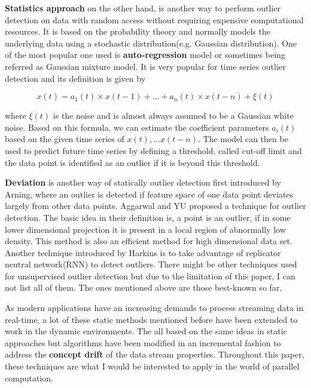 \documentclass[11pt]{article}       %
\begin{document}
\textbf{Statistics approach} on the other hand, is another way to perform outlier detection on data with random access without requiring expensive computational resources. It is based on the probability theory and normally models the underlying data using a stochastic distribution(e.g. Gaussian distribution). One of the most popular one used is \textbf{auto-regression} model or sometimes being referred as Gaussian mixture model\cite{4438332}. It is very popular for time series outlier detection and its definition is given by 

\[ x(t) = a_{1}(t) \times x(t-1) + ... + a_{n}(t) \times x(t -n) + \xi(t) \]

where $\xi(t)$ is the noise and is almost always assumed to be a Gaussian white noise. Based on this formula, we can estimate the coefficient parameters $a_{i}(t)$ based on the given time series of $x(t),...x(t-n)$. The model can then be used to predict future time series by defining a threshold, called cut-off limit and the data point is identified as an outlier if it is beyond this threshold.

\textbf{Deviation} is another way of statically outlier detection first introduced by Arning\cite{A.Arning:deviation}, where an outlier is detected if feature space of one data point deviates largely from other data points. Aggarwal and YU\cite{Aggarwal:2001:ODH:375663.375668} proposed a technique for outlier detection. The basic idea in their definition is, a point is an outlier, if in some lower dimensional projection it is present in a local region of abnormally low density. This method is also an efficient method for high dimensional data set\cite{04666541}. Another technique introduced by Harkins\cite{S.Harkins:rnn} is to take advantage of replicator neutral network(RNN) to detect outliers. There might be other techniques used for unsupervised outlier detection but due to the limitation of this paper, I can not list all of them. The ones mentioned above are those best-known so far.

As modern applications have an increasing demands to process streaming data in real-time, a lot of these static methods mentioned before have been extended to work in the dynamic environments. The all based on the same ideas in static approaches but algorithms have been modified in an incremental fashion to address the \textbf{concept drift} of the data stream properties. Throughout this paper, these techniques are what I would be interested to apply in the world of parallel computation.
\end{document}
